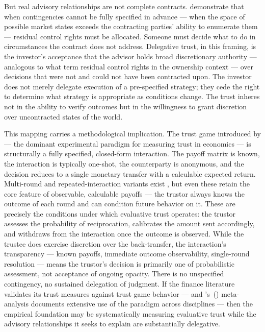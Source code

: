 But real advisory relationships are not complete contracts. \citet{GrossmanHart1986} demonstrate that when contingencies cannot be fully specified in advance --- when the space of possible market states exceeds the contracting parties' ability to enumerate them --- residual control rights must be allocated. Someone must decide what to do in circumstances the contract does not address. Delegative trust, in this framing, is the investor's acceptance that the advisor holds broad discretionary authority --- analogous to what \citeauthor{GrossmanHart1986} term residual control rights in the ownership context --- over decisions that were not and could not have been contracted upon. The investor does not merely delegate execution of a pre-specified strategy; they cede the right to determine what strategy is appropriate as conditions change. The trust inheres not in the ability to verify outcomes but in the willingness to grant discretion over uncontracted states of the world.

This mapping carries a methodological implication. The trust game introduced by \citet{BergDickhautMcCabe1995} --- the dominant experimental paradigm for measuring trust in economics --- is structurally a fully specified, closed-form interaction. The payoff matrix is known, the interaction is typically one-shot, the counterparty is anonymous, and the decision reduces to a single monetary transfer with a calculable expected return. Multi-round and repeated-interaction variants exist \citep{JohnsonMislin2011}, but even these retain the core feature of observable, calculable payoffs --- the trustor always knows the outcome of each round and can condition future behavior on it. These are precisely the conditions under which evaluative trust operates: the trustor assesses the probability of reciprocation, calibrates the amount sent accordingly, and withdraws from the interaction once the outcome is observed. While the trustee does exercise discretion over the back-transfer, the interaction's transparency --- known payoffs, immediate outcome observability, single-round resolution --- means the trustor's decision is primarily one of probabilistic assessment, not acceptance of ongoing opacity. There is no unspecified contingency, no sustained delegation of judgment. If the finance literature validates its trust measures against trust game behavior --- and \citeauthor{JohnsonMislin2011}'s~(\citeyear{JohnsonMislin2011}) meta-analysis documents extensive use of the paradigm across disciplines --- then the empirical foundation may be systematically measuring evaluative trust while the advisory relationships it seeks to explain are substantially delegative.


